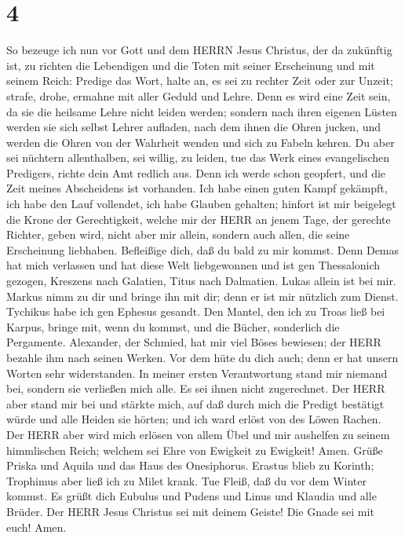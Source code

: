 \hypertarget{section-3}{%
\section{4}\label{section-3}}

 So bezeuge ich nun vor Gott und dem HERRN Jesus Christus,
der da zukünftig ist, zu richten die Lebendigen und die Toten mit seiner
Erscheinung und mit seinem Reich:  Predige das Wort, halte
an, es sei zu rechter Zeit oder zur Unzeit; strafe, drohe, ermahne mit
aller Geduld und Lehre.  Denn es wird eine Zeit sein, da sie
die heilsame Lehre nicht leiden werden; sondern nach ihren eigenen
Lüsten werden sie sich selbst Lehrer aufladen, nach dem ihnen die Ohren
jucken,  und werden die Ohren von der Wahrheit wenden und
sich zu Fabeln kehren.  Du aber sei nüchtern allenthalben,
sei willig, zu leiden, tue das Werk eines evangelischen Predigers,
richte dein Amt redlich aus.  Denn ich werde schon geopfert,
und die Zeit meines Abscheidens ist vorhanden.  Ich habe
einen guten Kampf gekämpft, ich habe den Lauf vollendet, ich habe
Glauben gehalten;  hinfort ist mir beigelegt die Krone der
Gerechtigkeit, welche mir der HERR an jenem Tage, der gerechte Richter,
geben wird, nicht aber mir allein, sondern auch allen, die seine
Erscheinung liebhaben.  Befleißige dich, daß du bald zu mir
kommst.  Denn Demas hat mich verlassen und hat diese Welt
liebgewonnen und ist gen Thessalonich gezogen, Kreszens nach Galatien,
Titus nach Dalmatien.  Lukas allein ist bei mir. Markus
nimm zu dir und bringe ihn mit dir; denn er ist mir nützlich zum Dienst.
 Tychikus habe ich gen Ephesus gesandt.  Den
Mantel, den ich zu Troas ließ bei Karpus, bringe mit, wenn du kommst,
und die Bücher, sonderlich die Pergamente.  Alexander, der
Schmied, hat mir viel Böses bewiesen; der HERR bezahle ihm nach seinen
Werken.  Vor dem hüte du dich auch; denn er hat unsern
Worten sehr widerstanden.  In meiner ersten Verantwortung
stand mir niemand bei, sondern sie verließen mich alle. Es sei ihnen
nicht zugerechnet.  Der HERR aber stand mir bei und stärkte
mich, auf daß durch mich die Predigt bestätigt würde und alle Heiden sie
hörten; und ich ward erlöst von des Löwen Rachen.  Der HERR
aber wird mich erlösen von allem Übel und mir aushelfen zu seinem
himmlischen Reich; welchem sei Ehre von Ewigkeit zu Ewigkeit! Amen.
 Grüße Priska und Aquila und das Haus des Onesiphorus.
 Erastus blieb zu Korinth; Trophimus aber ließ ich zu Milet
krank.  Tue Fleiß, daß du vor dem Winter kommst. Es grüßt
dich Eubulus und Pudens und Linus und Klaudia und alle Brüder.
 Der HERR Jesus Christus sei mit deinem Geiste! Die Gnade
sei mit euch! Amen.
